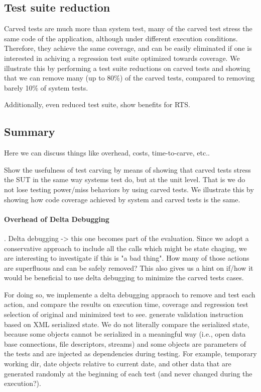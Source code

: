 \documentclass[10pt,conference]{IEEEtran}
\begin{document}
{\subsection{Test suite reduction}
Carved tests are much more than system test, many of the carved test stress the same code of the application, although under different execution conditions. Therefore, they achieve the same coverage, and can be easily eliminated if one is interested in achiving a regression test suite optimized towards coverage.
%
We illustrate this by performing a test suite reductions on carved tests and showing that we can remove many (up to 80\%) of the carved tests, compared to removing barely 10\% of system tests.

Additionally, even reduced test suite, show benefits for RTS.


\subsection{Summary}
Here we can discuss things like overhead, costs, time-to-carve, etc..


Show the usefulness of test carving by means of showing that 
carved tests stress the SUT in the same way systems test do, but at the unit level. 
That is we do not lose testing power/miss behaviors by using carved tests.
%
We illustrate this by showing how code coverage achieved by system and carved tests is the same.


\paragraph{Overhead of Delta Debugging}.
Delta debugging -> this one becomes part of the evaluation. Since we adopt a conservative approach to include all the calls which might be state chaging,
we are interesting to investigate if this is "a bad thing". How many of those actions are superfluous and can be safely removed?
This also gives us a hint on if/how it would be beneficial to use delta debugging to minimize the carved tests cases.

For doing so, we implemente a delta debugging appraoch to remove and test each action, and compare the results on execution time, coverage and regression test selection of original and minimized test to see.
	generate validation instruction based on XML serialized state. We do not literally compare the serialized state, because some objects cannot be serialized in a meaningful way (i.e., open data base connections, file descriptors, streams) and some objects are parameters of the tests and are injected as dependencies during testing. For example, temporary working dir, date objects relative to current date, and other data that are generated randomly at the beginning of each test (and never changed during the execution?). 
	
}
\end{document}
